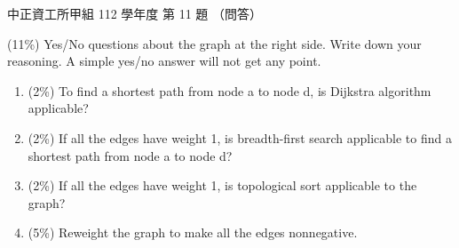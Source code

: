 \begin{pastexam}[label={px:ccu-112-swa-04}]{中正資工所甲組 112 學年度 第 11 題}
（問答）

(11\%) Yes/No questions about the graph at the right side. Write down your reasoning. A simple yes/no
answer will not get any point.
\begin{center}
\end{center}
\begin{enumerate}[label=(\alph*),itemsep=0pt,topsep=2pt]
\item (2\%) To find a shortest path from node a to node d, is Dijkstra algorithm applicable?
\item (2\%) If all the edges have weight 1, is breadth-first search applicable to find a shortest path from node a to node d?
\item (2\%) If all the edges have weight 1, is topological sort applicable to the graph?
\item (5\%) Reweight the graph to make all the edges nonnegative.
\end{enumerate}
\end{pastexam}


